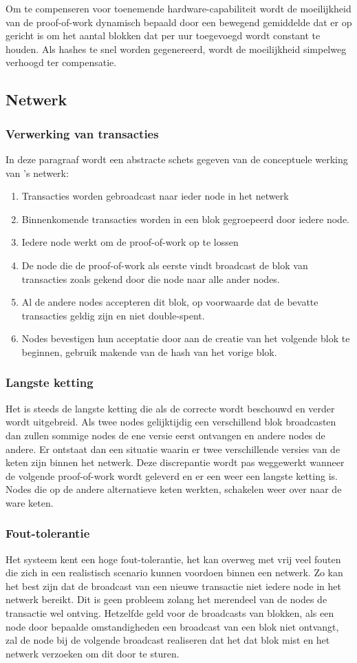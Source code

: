 	Om te compenseren voor toenemende hardware-capabiliteit wordt de moeilijkheid van de proof-of-work dynamisch bepaald door een bewegend gemiddelde dat er op gericht is om het aantal blokken dat per uur toegevoegd wordt constant te houden. Als hashes te snel worden gegenereerd, wordt de moeilijkheid simpelweg verhoogd ter compensatie. 
	\subsection{Netwerk}
		\subsubsection{Verwerking  van transacties}
		In deze paragraaf wordt een abstracte schets gegeven van de conceptuele werking van \textcite{Nakamoto2008}’s netwerk:
		\begin{enumerate}
			\item Transacties worden gebroadcast naar ieder node in het netwerk
			\item Binnenkomende transacties worden in een blok gegroepeerd door iedere node.
			\item Iedere node werkt om de proof-of-work op te lossen
			\item De node die de proof-of-work als eerste vindt broadcast de blok van transacties zoals gekend door die node naar alle ander nodes.
			\item Al de andere nodes accepteren dit blok, op voorwaarde dat de bevatte transacties geldig zijn en niet double-spent.
			\item Nodes bevestigen hun acceptatie door aan de creatie van het volgende blok te beginnen, gebruik makende van de hash van het vorige blok.
		\end{enumerate}
		\subsubsection{Langste ketting}
		Het is steeds de langste ketting die als de correcte wordt beschouwd en verder wordt uitgebreid. Als twee nodes gelijktijdig een verschillend blok broadcasten dan zullen sommige nodes de ene versie eerst ontvangen en andere nodes de andere. Er ontstaat dan een situatie waarin er twee verschillende versies van de keten zijn binnen het netwerk. Deze discrepantie wordt pas weggewerkt wanneer de volgende proof-of-work wordt geleverd en er een weer een langste ketting is. Nodes die op de andere alternatieve keten werkten, schakelen weer over naar de ware keten.
		\subsubsection{Fout-tolerantie}
		Het systeem kent een hoge fout-tolerantie, het kan overweg met vrij veel fouten die zich in een realistisch scenario  kunnen voordoen binnen een netwerk. Zo kan het best zijn dat de broadcast van een nieuwe transactie niet iedere node in het netwerk bereikt. Dit is geen probleem zolang het merendeel van de nodes de transactie wel ontving. Hetzelfde geld voor de broadcasts van blokken, als een node door bepaalde omstandigheden een broadcast van een blok niet ontvangt, zal de node bij de volgende broadcast realiseren dat het dat blok mist en het netwerk verzoeken om dit door te sturen.
